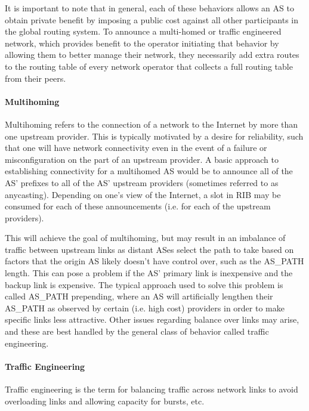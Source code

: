 It is important to note that in general, each of these behaviors allows an AS to obtain private benefit by imposing a public cost against all other participants in the global routing system. To announce a multi-homed or traffic engineered network, which provides benefit to the operator initiating that behavior by allowing them to better manage their network, they necessarily add extra routes to the routing table of every network operator that collects a full routing table from their peers.

\paragraph{Multihoming}

Multihoming refers to the connection of a network to the Internet by more than one upstream provider. This is typically motivated by a desire for reliability, such that one will have network connectivity even in the event of a failure or misconfiguration on the part of an upstream provider. A basic approach to establishing connectivity for a multihomed AS would be to announce all of the AS' prefixes to all of the AS' upstream providers (sometimes referred to as anycasting). Depending on one's view of the Internet, a slot in RIB may be consumed for each of these announcements (i.e. for each of the upstream providers).

This will achieve the goal of multihoming, but may result in an imbalance of traffic between upstream links as distant ASes select the path to take based on factors that the origin AS likely doesn't have control over, such as the AS\_PATH length. This can pose a problem if the AS' primary link is inexpensive and the backup link is expensive. The typical approach used to solve this problem is called AS\_PATH prepending, where an AS will artificially lengthen their AS\_PATH as observed by certain (i.e. high cost) providers in order to make specific links less attractive. Other issues regarding balance over links may arise, and these are best handled by the general class of behavior called traffic engineering.

\paragraph{Traffic Engineering}

Traffic engineering is the term for balancing traffic across network links to avoid overloading links and allowing capacity for bursts, etc.

